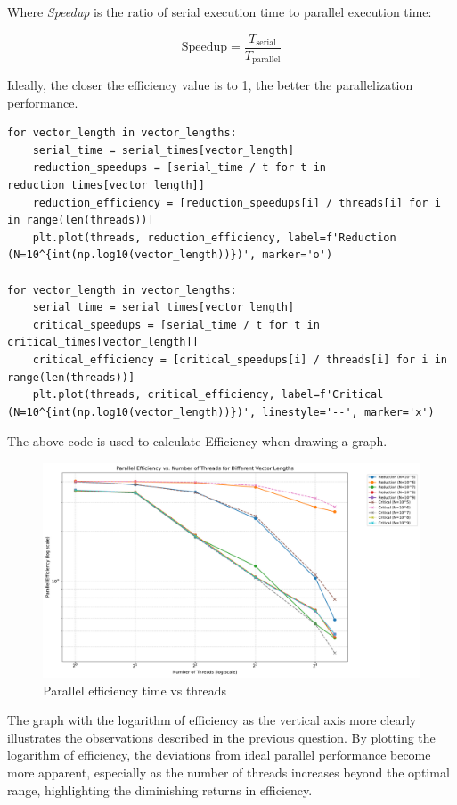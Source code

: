 \documentclass[unicode,11pt,a4paper,oneside,numbers=endperiod,openany]{scrartcl}
\begin{document}
Where \textit{Speedup} is the ratio of serial execution time to parallel execution time:

\[
\text{Speedup} = \frac{T_{\text{serial}}}{T_{\text{parallel}}}
\]

Ideally, the closer the efficiency value is to 1, the better the parallelization performance\cite{hager2010introduction}. 
\begin{lstlisting}[language=MyPython, style=mystyle, caption={Plotting Parallel Efficiency for Reduction and Critical Methods}]
for vector_length in vector_lengths:
    serial_time = serial_times[vector_length]
    reduction_speedups = [serial_time / t for t in reduction_times[vector_length]]
    reduction_efficiency = [reduction_speedups[i] / threads[i] for i in range(len(threads))]
    plt.plot(threads, reduction_efficiency, label=f'Reduction (N=10^{int(np.log10(vector_length))})', marker='o')

for vector_length in vector_lengths:
    serial_time = serial_times[vector_length]
    critical_speedups = [serial_time / t for t in critical_times[vector_length]]
    critical_efficiency = [critical_speedups[i] / threads[i] for i in range(len(threads))]
    plt.plot(threads, critical_efficiency, label=f'Critical (N=10^{int(np.log10(vector_length))})', linestyle='--', marker='x')
\end{lstlisting}
The above code is used to calculate Efficiency when drawing a graph.
\begin{figure}[h]
    \centering
    \includegraphics[width=1\textwidth]{pictures/parallel_efficiency_vs_threads.pdf}
    \caption{Parallel efficiency time vs threads}
\end{figure}

The graph with the logarithm of efficiency as the vertical axis more clearly illustrates the observations described in the previous question. By plotting the logarithm of efficiency, the deviations from ideal parallel performance become more apparent, especially as the number of threads increases beyond the optimal range, highlighting the diminishing returns in efficiency.
\end{document}
